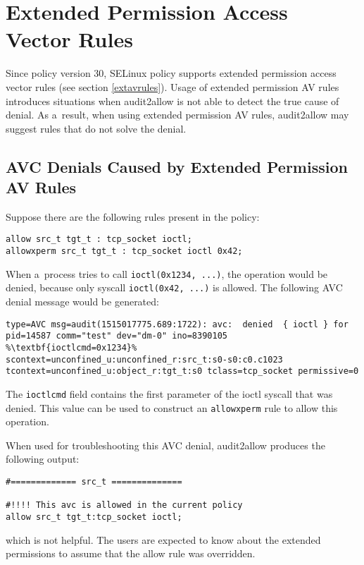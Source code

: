 \section{Extended Permission Access Vector Rules}
Since policy version 30, SELinux policy supports extended permission access
vector rules (see section \ref{extavrules}). Usage of extended permission AV
rules introduces situations when audit2allow is not able to detect the true
cause of denial. As a~result, when using extended permission AV rules,
audit2allow may suggest rules that do not solve the denial.

\subsection{AVC Denials Caused by Extended Permission AV Rules}
Suppose there are the following rules present in the policy:
\begin{lstlisting}
allow src_t tgt_t : tcp_socket ioctl;
allowxperm src_t tgt_t : tcp_socket ioctl 0x42;
\end{lstlisting}
When a~process tries to call \texttt{ioctl(0x1234, ...)}, the operation would be
denied, because only syscall \texttt{ioctl(0x42, ...)} is allowed. The following
AVC denial message would be generated:
\begin{lstlisting}[escapechar=\%]
type=AVC msg=audit(1515017775.689:1722): avc:  denied  { ioctl } for
pid=14587 comm="test" dev="dm-0" ino=8390105 %\textbf{ioctlcmd=0x1234}%
scontext=unconfined_u:unconfined_r:src_t:s0-s0:c0.c1023
tcontext=unconfined_u:object_r:tgt_t:s0 tclass=tcp_socket permissive=0
\end{lstlisting}
The \texttt{ioctlcmd} field contains the first parameter of the ioctl syscall
that was denied. This value can be used to construct an \texttt{allowxperm} rule
to allow this operation.

\pagebreak

When used for troubleshooting this AVC denial, audit2allow produces the
following output:
\begin{lstlisting}
#============= src_t ==============

#!!!! This avc is allowed in the current policy
allow src_t tgt_t:tcp_socket ioctl;
\end{lstlisting}
which is not helpful. The users are expected to know about the extended
permissions to assume that the allow rule was overridden.

